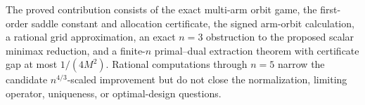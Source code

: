 The proved contribution consists of the exact multi-arm orbit game, the first-order saddle constant and allocation certificate, the signed arm-orbit calculation, a rational grid approximation, an exact \(n=3\) obstruction to the proposed scalar minimax reduction, and a finite-\(n\) primal--dual extraction theorem with certificate gap at most \(1/(4M^2)\).  Rational computations through \(n=5\) narrow the candidate \(n^{4/3}\)-scaled improvement but do not close the normalization, limiting operator, uniqueness, or optimal-design questions.